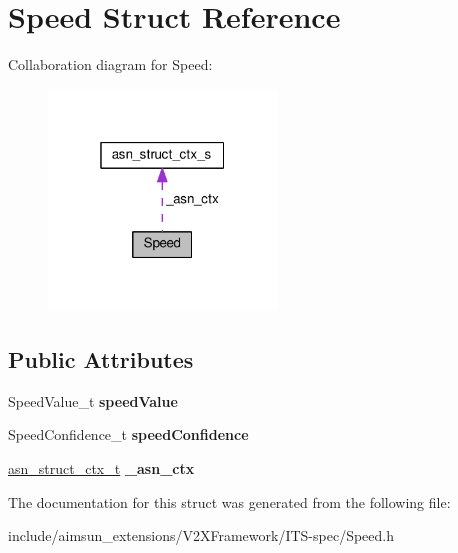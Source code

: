 \hypertarget{structSpeed}{}\section{Speed Struct Reference}
\label{structSpeed}


Collaboration diagram for Speed\+:\nopagebreak
\begin{figure}[H]
\begin{center}
\leavevmode
\includegraphics[width=172pt]{structSpeed__coll__graph}
\end{center}
\end{figure}
\subsection*{Public Attributes}
\begin{DoxyCompactItemize}
\item 
Speed\+Value\+\_\+t {\bfseries speed\+Value}\hypertarget{structSpeed_a872969f4996e4a7b39f1406bb2fc2d29}{}\label{structSpeed_a872969f4996e4a7b39f1406bb2fc2d29}

\item 
Speed\+Confidence\+\_\+t {\bfseries speed\+Confidence}\hypertarget{structSpeed_adb1dda66dd243a6fe66acbd148c0d519}{}\label{structSpeed_adb1dda66dd243a6fe66acbd148c0d519}

\item 
\hyperlink{structasn__struct__ctx__s}{asn\+\_\+struct\+\_\+ctx\+\_\+t} {\bfseries \+\_\+asn\+\_\+ctx}\hypertarget{structSpeed_ac0fa06d28eb4471a8894125ee9cfd27b}{}\label{structSpeed_ac0fa06d28eb4471a8894125ee9cfd27b}

\end{DoxyCompactItemize}


The documentation for this struct was generated from the following file\+:\begin{DoxyCompactItemize}
\item 
include/aimsun\+\_\+extensions/\+V2\+X\+Framework/\+I\+T\+S-\/spec/Speed.\+h\end{DoxyCompactItemize}
